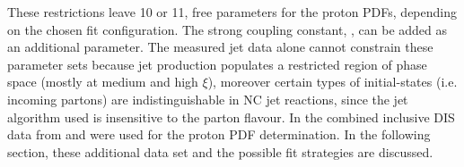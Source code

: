 These restrictions leave 10 or 11, free parameters for the proton PDFs, depending on the chosen fit configuration. The strong coupling constant, \asz, can be added as an additional parameter. The measured jet data alone cannot constrain these parameter sets because jet production populates a restricted region of phase space (mostly at medium and high $\xi$), moreover certain types of initial-states (i.e. incoming partons) are indistinguishable in NC jet reactions, since the jet algorithm used is insensitive to the parton flavour. In  the combined inclusive DIS data from \hone and \zeus were used for the proton PDF determination. In the following section, these additional data set and the possible fit strategies are discussed.
